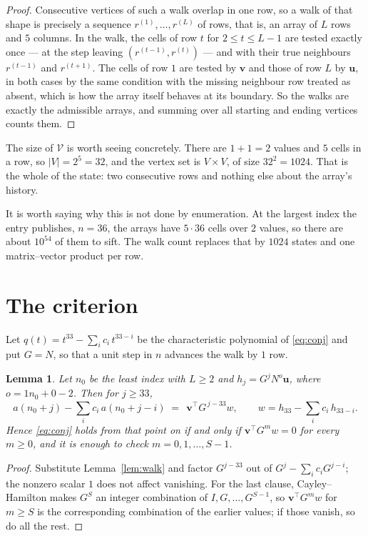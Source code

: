 \documentclass[11pt,a4paper]{article}
\theoremstyle{plain}
\newtheorem{lemma}[theorem]{Lemma}
\theoremstyle{definition}
\begin{document}
\begin{proof}
Consecutive vertices of such a walk overlap in one row, so a walk of that shape is
precisely a sequence $r^{(1)},\dots,r^{(L)}$ of rows, that is, an array of $L$ rows
and $5$ columns. In the walk, the cells of row $t$ for $2\le t\le L-1$ are tested
exactly once --- at the step leaving $(r^{(t-1)},r^{(t)})$ --- and with their true
neighbours $r^{(t-1)}$ and $r^{(t+1)}$. The cells of row $1$ are tested by
$\mathbf{v}$ and those of row $L$ by $\mathbf{u}$, in both cases by the same condition
with the missing neighbour row treated as absent, which is how the array itself behaves at
its boundary. So the walks are exactly the admissible arrays, and summing over all starting
and ending vertices counts them.
\end{proof}


The size of $\mathcal V$ is worth seeing concretely. There are $1+1=2$ values
and $5$ cells in a row, so $|V|=2^{5}=32$, and the vertex set is
$V\times V$, of size $32^2=1024$. That is the whole of the state: two consecutive
rows and nothing else about the array's history.

It is worth saying why this is not done by enumeration. At the largest index the entry
publishes, $n=36$, the arrays have $5\cdot36$ cells over
$2$ values, so there are about $10^{54}$ of them to sift. The
walk count replaces that by $1024$ states and one matrix--vector product per row.
\section{The criterion}

Let $q(t)=t^{33}-\sum_i c_i\,t^{33-i}$ be the characteristic polynomial of
\eqref{eq:conj} and put $G=N$, so that a unit step in $n$ advances the walk by
$1$ row.

\begin{lemma}\label{lem:crit}
Let $n_0$ be the least index with $L\ge2$ and $h_j=G^{j}N^{o}\mathbf{u}$, where
$o=1n_0+0-2$. Then for $j\ge33$,
\[
a(n_0+j)-\sum_i c_i\,a(n_0+j-i)\;=\;\,\mathbf{v}^{\!\top}G^{\,j-33}w,
\qquad w=h_{33}-\sum_i c_i\,h_{33-i} .
\]
Hence \eqref{eq:conj} holds from that point on if and only if
$\mathbf{v}^{\!\top}G^{m}w=0$ for every $m\ge0$, and it is enough to check
$m=0,1,\dots,S-1$.
\end{lemma}

\begin{proof}
Substitute Lemma~\ref{lem:walk} and factor $G^{j-33}$ out of
$G^{j}-\sum_ic_iG^{j-i}$; the nonzero scalar $1$ does not affect
vanishing. For the last clause, Cayley--Hamilton makes $G^{S}$ an integer combination of
$I,G,\dots,G^{S-1}$, so $\mathbf{v}^{\!\top}G^{m}w$ for $m\ge S$ is the corresponding
combination of the earlier values; if those vanish, so do all the rest.
\end{proof}
\end{document}
